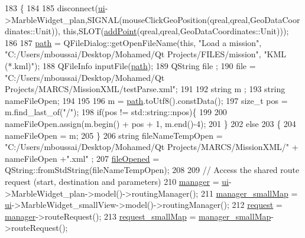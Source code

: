 \begin{DoxyCode}
183                        \{
184 
185    disconnect(\hyperlink{a00015_a4f4e978b71511ee6fcb91ef1a4e3c17c}{ui}->MarbleWidget\_plan,SIGNAL(mouseClickGeoPosition(qreal,qreal,GeoDataCoordinates::Unit)),\textcolor{keyword}{
      this},SLOT(\hyperlink{a00015_a070a5570eaeac36ef13715ca18be3ec9}{addPoint}(qreal,qreal,GeoDataCoordinates::Unit)));
186 
187     \hyperlink{a00015_a34b772573db9a14b1acb61b24709ae73}{path} = QFileDialog::getOpenFileName(\textcolor{keyword}{this}, \textcolor{stringliteral}{"Load a mission"}, \textcolor{stringliteral}{"C:/Users/mboussai/Desktop/Mohamed/Qt
       Projects/FILES/mission"}, \textcolor{stringliteral}{"KML (*.kml)"});
188     QFileInfo inputFile(\hyperlink{a00015_a34b772573db9a14b1acb61b24709ae73}{path});
189     QString file ;
190     file = \textcolor{stringliteral}{"C:/Users/mboussai/Desktop/Mohamed/Qt Projects/MARCS/MissionXML/testParse.xml"};
191 
192     \textcolor{keywordtype}{string} m ;
193     \textcolor{keywordtype}{string} nameFileOpen;
194 
195 
196     m = \hyperlink{a00015_a34b772573db9a14b1acb61b24709ae73}{path}.toUtf8().constData();
197     \textcolor{keywordtype}{size\_t} pos = m.find\_last\_of(\textcolor{stringliteral}{"/"});
198     \textcolor{keywordflow}{if}(pos != std::string::npos)\{
199 
200         nameFileOpen.assign(m.begin() + pos + 1, m.end()-4);
201     \}
202       \textcolor{keywordflow}{else}
203     \{
204       nameFileOpen = m;
205   \}
206     \textcolor{keywordtype}{string} fileNameTempOpen = \textcolor{stringliteral}{"C:/Users/mboussai/Desktop/Mohamed/Qt Projects/MARCS/MissionXML/"} + 
      nameFileOpen +\textcolor{stringliteral}{".xml"} ;
207     \hyperlink{a00042_ae55f476d1700ade204b3038b8c37f8ba}{fileOpened} =  QString::fromStdString(fileNameTempOpen);
208 
209     \textcolor{comment}{// Access the shared route request (start, destination and parameters)}
210     \hyperlink{a00042_a02d3f124c170b0126dab54f6e5a18dae}{manager} = \hyperlink{a00015_a4f4e978b71511ee6fcb91ef1a4e3c17c}{ui}->MarbleWidget\_plan->model()->routingManager();
211     \hyperlink{a00042_aca10b4dc402bfe3d17f1fcba33544252}{manager\_smallMap} = \hyperlink{a00015_a4f4e978b71511ee6fcb91ef1a4e3c17c}{ui}->MarbleWidget\_smallView->model()->routingManager();
212     \hyperlink{a00042_ade0ea03ae98566eaed4f7a1f331f237a}{request} = \hyperlink{a00042_a02d3f124c170b0126dab54f6e5a18dae}{manager}->routeRequest();
213     \hyperlink{a00042_aeae2fdde26f8ed9003c0cf66a1f25662}{request\_smallMap} = \hyperlink{a00042_aca10b4dc402bfe3d17f1fcba33544252}{manager\_smallMap}->routeRequest();

\end{DoxyCode}
